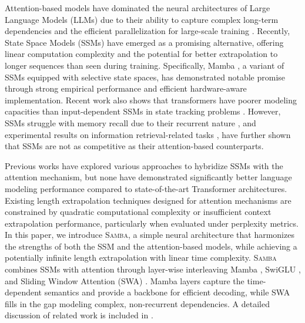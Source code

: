 \documentclass{article}
\begin{document}
Attention-based models \citep{vaswani2017attention, bahdanau2014neural} have dominated the neural architectures of Large Language Models (LLMs) \citep{gpt2, gpt3, openai2023gpt4, bubeck2023sparks} due to their ability to capture complex long-term dependencies and the efficient parallelization for large-scale training \citep{dao2022flashattention}.
Recently, State Space Models (SSMs) \citep{gu2021efficiently,s5,s4d, gu2023mamba} have emerged as a promising alternative, offering linear computation complexity and the potential for better extrapolation to longer sequences than seen during training. Specifically, Mamba \citep{gu2023mamba}, a variant of SSMs equipped with selective state spaces, has demonstrated notable promise through strong empirical performance and efficient hardware-aware implementation. Recent work also shows that transformers have poorer modeling capacities than input-dependent SSMs in state tracking problems \citep{merrill2024illusion}.
However, SSMs struggle with memory recall due to their recurrent nature \citep{arora2023zoology}, and experimental results on information retrieval-related tasks \citep{h3, wen2024rnns, arora2024simple}, have further shown that SSMs are not as competitive as their attention-based counterparts. 



Previous works \citep{zuo2022efficient, h3, mega, ren2023sparse} have explored various approaches to hybridize SSMs with the attention mechanism, but none have demonstrated significantly better language modeling performance compared to state-of-the-art Transformer architectures. Existing length extrapolation techniques \citep{han2023lminfinite, xiao2023efficient, jin2024llm} designed for attention mechanisms are constrained by quadratic computational complexity or insufficient context extrapolation performance, particularly when evaluated under perplexity metrics.
In this paper, we introduce \textsc{Samba}, a simple neural architecture that harmonizes the strengths of both the SSM and the attention-based models, while achieving a potentially infinite length extrapolation with linear time complexity.
\textsc{Samba} combines SSMs with attention through layer-wise interleaving Mamba \citep{gu2023mamba}, SwiGLU \citep{shazeer2020glu}, and Sliding Window Attention (SWA) \citep{beltagy2020longformer}. Mamba layers capture the time-dependent semantics and provide a backbone for efficient decoding, while SWA fills in the gap modeling complex, non-recurrent dependencies. A detailed discussion of related work is included in .
\end{document}
